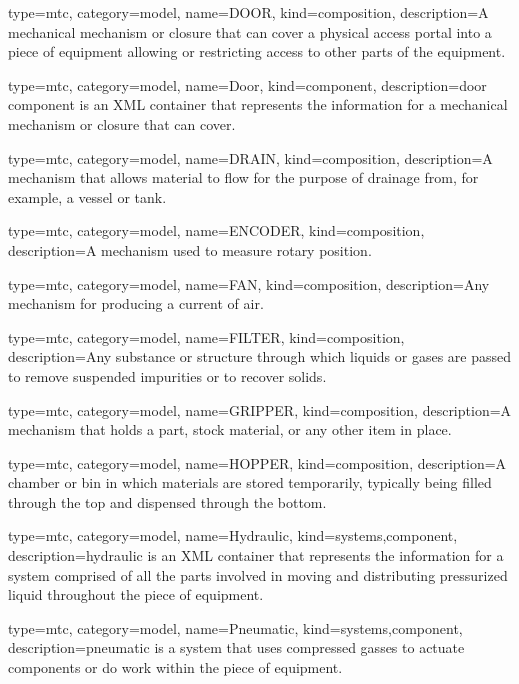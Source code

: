 {
  type=mtc,
  category=model,
  name={DOOR},
  kind={composition},
  description={A mechanical mechanism or closure that can cover a physical access portal into a piece of equipment allowing or restricting access to other parts of the equipment.}
}


{
  type=mtc,
  category=model,
  name={Door},
  kind={component},
  description={\gls{door component} is an XML container that represents the information for a mechanical mechanism or closure that can cover.}
}


{
  type=mtc,
  category=model,
  name={DRAIN},
  kind={composition},
  description={A mechanism that allows material to flow for the purpose of drainage from, for example, a vessel or tank.}
}


{
  type=mtc,
  category=model,
  name={ENCODER},
  kind={composition},
  description={A mechanism used to measure rotary position.}
}


{
  type=mtc,
  category=model,
  name={FAN},
  kind={composition},
  description={Any mechanism for producing a current of air.}
}


{
  type=mtc,
  category=model,
  name={FILTER},
  kind={composition},
  description={Any substance or structure through which liquids or gases are passed to remove suspended impurities or to recover solids.}
}


{
  type=mtc,
  category=model,
  name={GRIPPER},
  kind={composition},
  description={A mechanism that holds a part, stock material, or any other item in place.}
}


{
  type=mtc,
  category=model,
  name={HOPPER},
  kind={composition},
  description={A chamber or bin in which materials are stored temporarily, typically being filled through the top and dispensed through the bottom.}
}


{
  type=mtc,
  category=model,
  name={Hydraulic},
  kind={systems,component},
  description={\gls{hydraulic} is an XML container that represents the information for a system comprised of all the parts involved in moving and distributing pressurized liquid throughout the piece of equipment.}
}


{
  type=mtc,
  category=model,
  name={Pneumatic},
  kind={systems,component},
  description={\gls{pneumatic} is a system that uses compressed gasses to actuate components or do work within the piece of equipment.}
}


